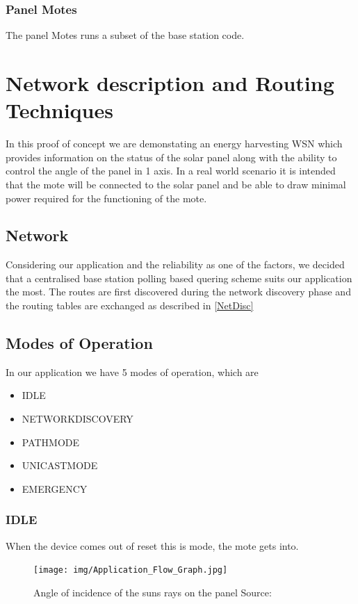 \documentclass[conference]{IEEEtran}
\begin{document}
\subsubsection{Panel Motes}
    The panel Motes runs a subset of the base station code.

\section{Network description and Routing Techniques}
In this proof of concept we are demonstating an energy harvesting WSN which provides information on the status of the solar panel along with the ability to control the angle of the panel in 1 axis. In a real world scenario it is intended that the mote\cite{REmote} will be connected to the solar panel and be able to draw minimal power required for the functioning of the mote.
\subsection{Network}
Considering our application and the reliability as one of the factors, we decided that a centralised base station polling based quering scheme suits our application the most. The routes are first discovered during the network discovery phase and the routing tables are exchanged as described in \ref{NetDisc}

\subsection{Modes of Operation}
In our application we have 5 modes of operation, which are 
\begin{itemize}
    \item IDLE
    \item NETWORKDISCOVERY
    \item PATHMODE
    \item UNICASTMODE
    \item EMERGENCY
\end{itemize}


\subsubsection{IDLE} \label{IDLEMODE}
When the device comes out of reset this is mode, the mote gets into.

\begin{figure}[htbp]
    \texttt{[image: img/Application\_Flow\_Graph.jpg]}
    \centering
    \captionsetup{justification=centering}
    \caption{Angle of incidence of the suns rays on the panel Source: \cite{b2}}
    \label{fig:StateMachine}
\end{figure}
\end{document}

